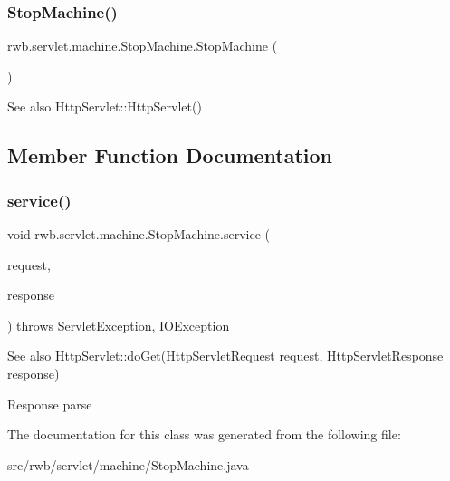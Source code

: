 \subsubsection{\texorpdfstring{Stop\+Machine()}{StopMachine()}}
{\footnotesize\ttfamily rwb.\+servlet.\+machine.\+Stop\+Machine.\+Stop\+Machine (\begin{DoxyParamCaption}{ }\end{DoxyParamCaption})}

\begin{DoxySeeAlso}{See also}
Http\+Servlet\+::\+Http\+Servlet() 
\end{DoxySeeAlso}


\subsection{Member Function Documentation}
\mbox{\label{classrwb_1_1servlet_1_1machine_1_1_stop_machine_ab9b293fb9c090bff7d3f476a959bae87}} 
\subsubsection{\texorpdfstring{service()}{service()}}
{\footnotesize\ttfamily void rwb.\+servlet.\+machine.\+Stop\+Machine.\+service (\begin{DoxyParamCaption}\item[{Http\+Servlet\+Request}]{request,  }\item[{Http\+Servlet\+Response}]{response }\end{DoxyParamCaption}) throws Servlet\+Exception, I\+O\+Exception\hspace{0.3cm}{\ttfamily [protected]}}

\begin{DoxySeeAlso}{See also}
Http\+Servlet\+::do\+Get(\+Http\+Servlet\+Request request, Http\+Servlet\+Response response) 
\end{DoxySeeAlso}
Response parse

The documentation for this class was generated from the following file\+:\begin{DoxyCompactItemize}
\item 
src/rwb/servlet/machine/Stop\+Machine.\+java\end{DoxyCompactItemize}
